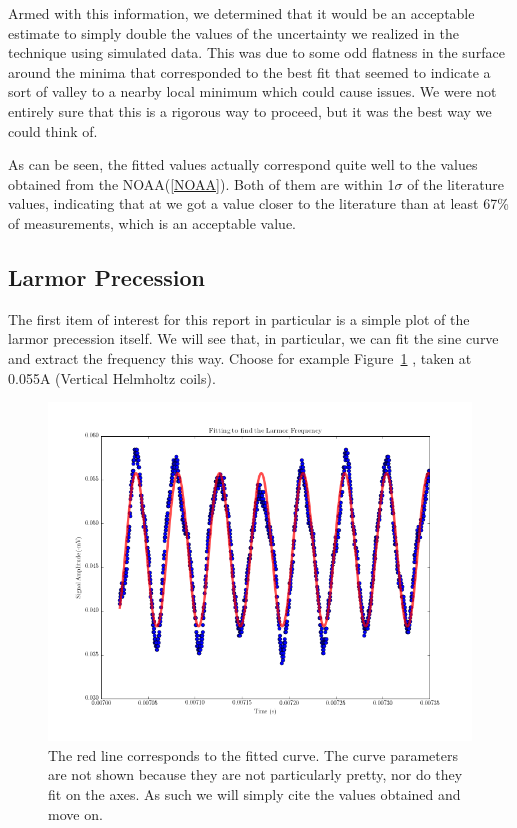 \documentclass{article}
\begin{document}
    \hspace{.25cm}

    Armed with this information, we determined that it would be an acceptable estimate to simply double the values of the uncertainty we realized in the technique using simulated data.  This was due to some odd flatness in the surface around the minima that corresponded to the best fit that seemed to indicate a sort of valley to a nearby local minimum which could cause issues.  We were not entirely sure that this is a rigorous way to proceed, but it was the best way we could think of.

    \hspace{.25cm}

    As can be seen, the fitted values actually correspond quite well to the values obtained from the NOAA(\ref{NOAA}).  Both of them are within 1$\sigma$ of the literature values, indicating that at we got a value closer to the literature than at least 67\% of measurements, which is an acceptable value.

  \subsection{Larmor Precession}
    The first item of interest for this report in particular is a simple plot of the larmor precession itself.  We will see that, in particular, we can fit the sine curve and extract the frequency this way.  Choose for example Figure~\ref{sinwave} , taken at 0.055A (Vertical Helmholtz coils).

    \begin{figure}[!htb]
      \centering
      \includegraphics[scale=.45]{../plots/(larmor_y0_055A).png}
      \caption{The red line corresponds to the fitted curve.  The curve parameters are not shown because they are not particularly pretty, nor do they fit on the axes.  As such we will simply cite the values obtained and move on.}
      \label{sinwave}
    \end{figure}
\end{document}
